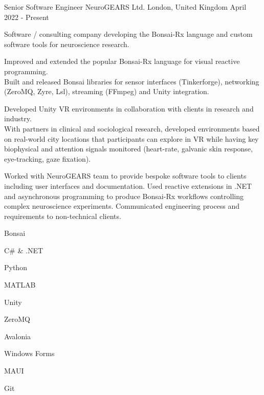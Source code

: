 

\begin{cventries}

  \cventry%
    {Senior Software Engineer} %
    {NeuroGEARS Ltd.} %
    {London, United Kingdom} %
    {April 2022 \-- Present} %
    {
      \begin{cvsentence}Software / consulting company developing the Bonsai-Rx language and custom software tools for neuroscience research.\end{cvsentence}
      \begin{cvitems} %
        \item {Improved and extended the popular Bonsai-Rx language for visual reactive programming.} \\
        Built and released Bonsai libraries for sensor interfaces (Tinkerforge), networking (ZeroMQ, Zyre, Lsl), streaming (FFmpeg) and Unity integration.
        \item {Developed Unity VR environments in collaboration with clients in research and industry.} \\
        With partners in clinical and sociological research, developed environments based on real-world city locations that participants can explore in VR while having key biophysical and attention signals monitored (heart-rate, galvanic skin response, eye-tracking, gaze fixation).
        \item {Worked with NeuroGEARS team to provide bespoke software tools to clients including user interfaces and documentation. Used reactive extensions in .NET and asynchronous programming to produce Bonsai-Rx workflows controlling complex neuroscience experiments. Communicated engineering process and requirements to non-technical clients.}
      \end{cvitems}
    }
    \begin{cventryskills}
      \item Bonsai
      \item C\# \& .NET
      \item Python
      \item MATLAB
      \item Unity
      \item ZeroMQ
      \item Avalonia
      \item Windows Forms
      \item MAUI
      \item Git
    \end{cventryskills}


\end{cventries}
